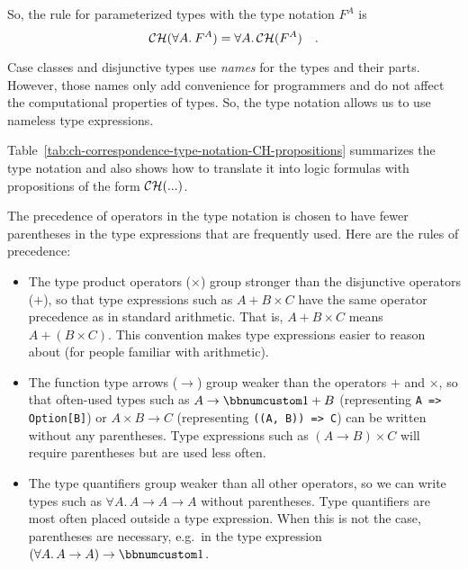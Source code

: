 So, the rule for parameterized types with the type notation $F^{A}$
is
\[
{\cal CH}(\forall A.\:F^{A})=\forall A.\,{\cal CH}(F^{A})\quad.
\]

Case classes and disjunctive types use \emph{names} for the types
and their parts. However, those names only add convenience for programmers
and do not affect the computational properties of types. So, the type
notation allows us to use nameless type expressions.

Table~\ref{tab:ch-correspondence-type-notation-CH-propositions}
summarizes the type notation and also shows how to translate it into
logic formulas with propositions of the form ${\cal CH}(...)$.

The precedence of operators
in the type notation is chosen to have fewer parentheses in the type
expressions that are frequently used. Here are the rules of precedence:
\begin{itemize}
\item The type product operators ($\times$) group stronger than the disjunctive
operators ($+$), so that type expressions such as $A+B\times C$
have the same operator precedence as in standard arithmetic. That
is, $A+B\times C$ means $A+\left(B\times C\right)$. This convention
makes type expressions easier to reason about (for people familiar
with arithmetic).
\item The function type arrows ($\rightarrow$) group weaker than the operators
$+$ and $\times$, so that often-used types such as $A\rightarrow\bbnum 1+B$
(representing \lstinline!A => Option[B]!) or $A\times B\rightarrow C$
(representing \lstinline!((A, B)) => C!) can be written without any
parentheses. Type expressions such as $\left(A\rightarrow B\right)\times C$
will require parentheses but are used less often.
\item The type quantifiers group weaker than all other operators, so we
can write types such as $\forall A.\,A\rightarrow A\rightarrow A$
without parentheses. Type quantifiers are most often placed outside
a type expression. When this is not the case, parentheses are necessary,
e.g.~in the type expression $\left(\forall A.\,A\rightarrow A\right)\rightarrow\bbnum 1$.
\end{itemize}
